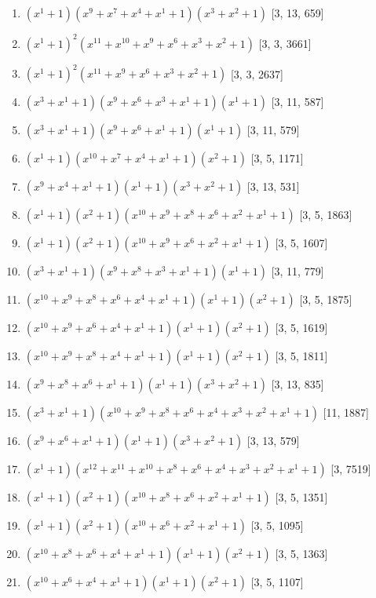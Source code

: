 \documentclass[10pt,twocolumn]{article}
\begin{document}
\begin{enumerate}
\item $(x^{1} + 1)(x^{9} + x^{7} + x^{4} + x^{1} + 1)(x^{3} + x^{2} + 1)$  [3, 13, 659]
\item $(x^{1} + 1)^{2}(x^{11} + x^{10} + x^{9} + x^{6} + x^{3} + x^{2} + 1)$  [3, 3, 3661]
\item $(x^{1} + 1)^{2}(x^{11} + x^{9} + x^{6} + x^{3} + x^{2} + 1)$  [3, 3, 2637]
\item $(x^{3} + x^{1} + 1)(x^{9} + x^{6} + x^{3} + x^{1} + 1)(x^{1} + 1)$  [3, 11, 587]
\item $(x^{3} + x^{1} + 1)(x^{9} + x^{6} + x^{1} + 1)(x^{1} + 1)$  [3, 11, 579]
\item $(x^{1} + 1)(x^{10} + x^{7} + x^{4} + x^{1} + 1)(x^{2} + 1)$  [3, 5, 1171]
\item $(x^{9} + x^{4} + x^{1} + 1)(x^{1} + 1)(x^{3} + x^{2} + 1)$  [3, 13, 531]
\item $(x^{1} + 1)(x^{2} + 1)(x^{10} + x^{9} + x^{8} + x^{6} + x^{2} + x^{1} + 1)$  [3, 5, 1863]
\item $(x^{1} + 1)(x^{2} + 1)(x^{10} + x^{9} + x^{6} + x^{2} + x^{1} + 1)$  [3, 5, 1607]
\item $(x^{3} + x^{1} + 1)(x^{9} + x^{8} + x^{3} + x^{1} + 1)(x^{1} + 1)$  [3, 11, 779]
\item $(x^{10} + x^{9} + x^{8} + x^{6} + x^{4} + x^{1} + 1)(x^{1} + 1)(x^{2} + 1)$  [3, 5, 1875]
\item $(x^{10} + x^{9} + x^{6} + x^{4} + x^{1} + 1)(x^{1} + 1)(x^{2} + 1)$  [3, 5, 1619]
\item $(x^{10} + x^{9} + x^{8} + x^{4} + x^{1} + 1)(x^{1} + 1)(x^{2} + 1)$  [3, 5, 1811]
\item $(x^{9} + x^{8} + x^{6} + x^{1} + 1)(x^{1} + 1)(x^{3} + x^{2} + 1)$  [3, 13, 835]
\item $(x^{3} + x^{1} + 1)(x^{10} + x^{9} + x^{8} + x^{6} + x^{4} + x^{3} + x^{2} + x^{1} + 1)$  [11, 1887]
\item $(x^{9} + x^{6} + x^{1} + 1)(x^{1} + 1)(x^{3} + x^{2} + 1)$  [3, 13, 579]
\item $(x^{1} + 1)(x^{12} + x^{11} + x^{10} + x^{8} + x^{6} + x^{4} + x^{3} + x^{2} + x^{1} + 1)$  [3, 7519]
\item $(x^{1} + 1)(x^{2} + 1)(x^{10} + x^{8} + x^{6} + x^{2} + x^{1} + 1)$  [3, 5, 1351]
\item $(x^{1} + 1)(x^{2} + 1)(x^{10} + x^{6} + x^{2} + x^{1} + 1)$  [3, 5, 1095]
\item $(x^{10} + x^{8} + x^{6} + x^{4} + x^{1} + 1)(x^{1} + 1)(x^{2} + 1)$  [3, 5, 1363]
\item $(x^{10} + x^{6} + x^{4} + x^{1} + 1)(x^{1} + 1)(x^{2} + 1)$  [3, 5, 1107]

\end{enumerate}
\end{document}
